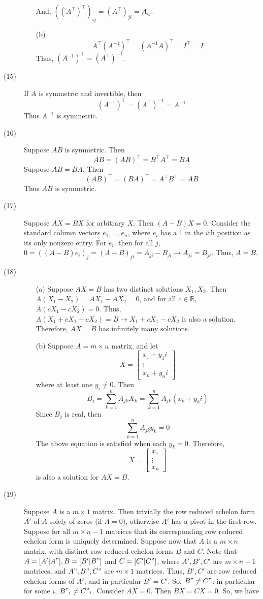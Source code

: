 \begin{description}
\begin{itemize}
And, $((A^\top)^\top)_{ij} = (A^\top)_{ji} = A_{ij}$.
\item[(b)]
$$A^\top(A^{-1})^\top = (A^{-1}A)^\top = I^\top = I$$
Thus, $(A^{-1})^\top = (A^\top)^{-1}$.
\end{itemize}
\item[(15)]
If $A$ is symmetric and invertible, then
$$(A^{-1})^\top = (A^\top)^{-1} = A^{-1}$$
Thus $A^{-1}$ is symmetric.
\item[(16)]
Suppose $AB$ is symmetric. Then
$$AB = (AB)^\top = B^\top A^\top = BA$$
Suppose $AB = BA$. Then
$$(AB)^\top = (BA)^\top = A^\top B^\top = AB$$
Thus $AB$ is symmetric.
\item[(17)]
Suppose $AX = BX$ for arbitrary $X$. Then $(A - B)X = 0$. Consider the standard column vectors $e_1, ..., e_n$, where $e_i$ has a 1 in the $i$th position as its only nonzero entry. For $e_i$, then for all $j$, $0 = ((A - B)e_i)_j = (A - B)_{ji} = A_{ji} - B_{ji} \rightarrow A_{ji} = B_{ji}$. Thus, $A = B$.
\item[(18)]
\begin{itemize}
\item[(a)] Suppose $AX = B$ has two distinct solutions $X_1, X_2$. Then $A(X_1 - X_2) = AX_1 - AX_2 = 0$, and for all $c \in \mathbb{R}$, $A(cX_1 - cX_2) = 0$. Thus, $A(X_1 + cX_1 - cX_2) = B \rightarrow X_1 + cX_1 - cX_2$ is also a solution. Therefore, $AX = B$ has infinitely many solutions.
\item[(b)]
Suppose $A = m \times n$ matrix, and let
$$X = \begin{bmatrix}
x_1 + y_1i \\
\vdots \\
x_n + y_ni
\end{bmatrix}$$
where at least one $y_i \neq 0$. Then
$$B_j = \sum_{k=1}^n A_{jk}X_k = \sum_{k=1}^n A_{jk}(x_k + y_ki)$$
Since $B_j$ is real, then
$$\sum_{k=1}^n A_{jk}y_{k} = 0$$
The above equation is satisfied when each $y_{k} = 0$. Therefore,
$$X = \begin{bmatrix}
x_1 \\
\vdots \\
x_n
\end{bmatrix}$$
is also a solution for $AX = B$.
\end{itemize}
\item[(19)]
Suppose $A$ is a $m \times 1$ matrix. Then trivially the row reduced echelon form $A'$ of $A$ solely of zeros (if $A = 0$), otherwise $A'$ has a pivot in the first row. Suppose for all $m \times n - 1$ matrices that its corresponding row reduced echelon form is uniquely determined. Suppose now that $A$ is a $m \times n$ matrix, with distinct row reduced echelon forms $B$ and $C$. Note that $A = [A' | A"], B = [B' | B"]$ and $C = [C' | C"]$, where $A', B', C'$ are $m \times n - 1$ matrices, and $A", B", C"$ are $m \times 1$ matrices. Thus, $B', C'$ are row reduced echelon forms of $A'$, and in particular $B' = C'$. So, $B" \neq C"$: in particular for some $i$, $B"_i \neq C"_i$. Consider $AX = 0$. Then $BX = CX = 0$. So, we have

\end{description}
